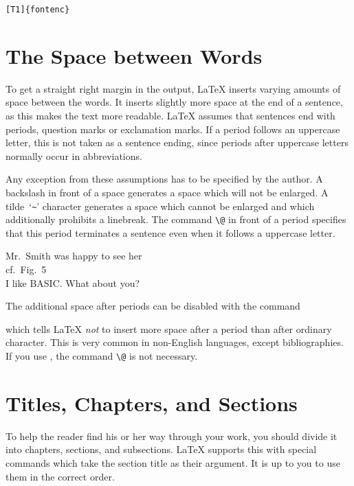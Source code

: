 \begin{command}
\verb|[T1]{fontenc}| 
\end{command}


\section{The Space between Words}

To get a straight right margin in the output, \LaTeX{} inserts varying
amounts of space between the words. It inserts slightly more space at
the end of a sentence, as this makes the text more readable.  \LaTeX{}
assumes that sentences end with periods, question marks or exclamation
marks. If a period follows an uppercase letter, this is not taken as a
sentence ending, since periods after uppercase letters normally occur in
abbreviations.

Any exception from these assumptions has to be specified by the
author. A backslash in front of a space generates a space which will
not be enlarged. A tilde~`\verb|~|' character generates a space which cannot be
enlarged and which additionally prohibits a linebreak. The command
\verb|\@| in front of a period specifies that this period terminates a
sentence even when it follows a uppercase letter.
  

\begin{example}
Mr.~Smith was happy to see her\\
cf.~Fig.~5\\
I like BASIC\@. What about you?
\end{example}

The additional space after periods can be disabled with the command
\begin{command}
\end{command}
\noindent which tells \LaTeX{} \emph{not} to insert more space after a
period than after ordinary character. This is very common in
non-English languages, except bibliographies. If you use
, the command \verb|\@| is not necessary.
    
\section{Titles, Chapters, and Sections}

To help the reader find his or her way through your work, you should
divide it into chapters, sections, and subsections.  \LaTeX{} supports
this with special commands which take the section title as their
argument.  It is up to you to use them in the correct order.

